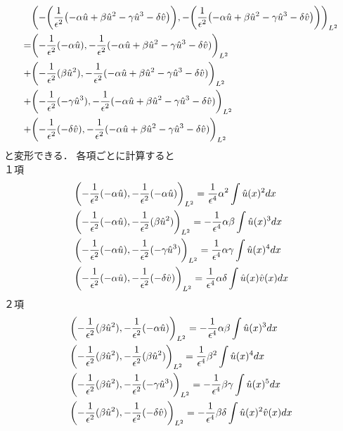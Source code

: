\begin{align}
  &\qty(-\qty(\dfrac{1}{\epsilon^2}\qty(-\alpha \hat{u} + \beta \hat{u}^2 -\gamma \hat{u}^3-\delta \hat{v})),
   -\qty(\dfrac{1}{\epsilon^2}\qty(-\alpha \hat{u} + \beta \hat{u}^2 -\gamma \hat{u}^3-\delta \hat{v})))_{L^2}\\
  =&
  \qty(-\dfrac{1}{\epsilon^2}(-\alpha \hat{u}),-\frac{1}{\epsilon^2}(-\alpha \hat{u} + \beta \hat{u}^2 -\gamma \hat{u}^3-\delta \hat{v}))_{L^2}\\
  +&
  \qty(-\dfrac{1}{\epsilon^2}(\beta \hat{u}^2),-\frac{1}{\epsilon^2}(-\alpha \hat{u} + \beta \hat{u}^2 -\gamma \hat{u}^3-\delta \hat{v}))_{L^2}\\
  +&
  \qty(-\dfrac{1}{\epsilon^2}(-\gamma \hat{u}^3),-\frac{1}{\epsilon^2}(-\alpha \hat{u} + \beta \hat{u}^2 -\gamma \hat{u}^3-\delta \hat{v}))_{L^2}\\
  +&
  \qty(-\dfrac{1}{\epsilon^2}(-\delta \hat{v}),-\frac{1}{\epsilon^2}(-\alpha \hat{u} + \beta \hat{u}^2 -\gamma \hat{u}^3-\delta \hat{v}))_{L^2}\\
\end{align}
と変形できる．
各項ごとに計算すると\\
１項
\begin{align}
  &\qty(-\frac{1}{\epsilon^2}(-\alpha \hat{u}),-\dfrac{1}{\epsilon^2}(-\alpha \hat{u}))_{L^2}
  =\dfrac{1}{\epsilon^4}\alpha^2 \int \hat{u}(x)^2 dx\\
  &\qty(-\frac{1}{\epsilon^2}(-\alpha \hat{u}),-\dfrac{1}{\epsilon^2}(\beta \hat{u}^2))_{L^2}
  =-\dfrac{1}{\epsilon^4}\alpha\beta \int \hat{u}(x)^3 dx\\
  &\qty(-\frac{1}{\epsilon^2}(-\alpha \hat{u}),-\dfrac{1}{\epsilon^2}(-\gamma \hat{u}^3))_{L^2}
  =\dfrac{1}{\epsilon^4}\alpha\gamma \int \hat{u}(x)^4 dx\\
  &\qty(-\frac{1}{\epsilon^2}(-\alpha \hat{u}),-\dfrac{1}{\epsilon^2}(-\delta \hat{v}))_{L^2}
  =\dfrac{1}{\epsilon^4}\alpha\delta \int \hat{u}(x)\hat{v}(x) dx\\
\end{align}
２項
\begin{align}
  &\qty(-\dfrac{1}{\epsilon^2}(\beta \hat{u}^2),-\dfrac{1}{\epsilon^2}(-\alpha \hat{u}))_{L^2}
  =-\dfrac{1}{\epsilon^4}\alpha\beta \int \hat{u}(x)^3 dx\\
  &\qty(-\dfrac{1}{\epsilon^2}(\beta \hat{u}^2),-\dfrac{1}{\epsilon^2}(\beta \hat{u}^2))_{L^2}
  =\dfrac{1}{\epsilon^4}\beta^2 \int \hat{u}(x)^4 dx\\
  &\qty(-\dfrac{1}{\epsilon^2}(\beta \hat{u}^2),-\dfrac{1}{\epsilon^2}(-\gamma \hat{u}^3))_{L^2}
  =-\dfrac{1}{\epsilon^4}\beta\gamma \int \hat{u}(x)^5 dx\\
  &\qty(-\dfrac{1}{\epsilon^2}(\beta \hat{u}^2),-\dfrac{1}{\epsilon^2}(-\delta \hat{v}))_{L^2}
  =-\dfrac{1}{\epsilon^4}\beta\delta \int \hat{u}(x)^2\hat{v}(x) dx\\
\end{align}
